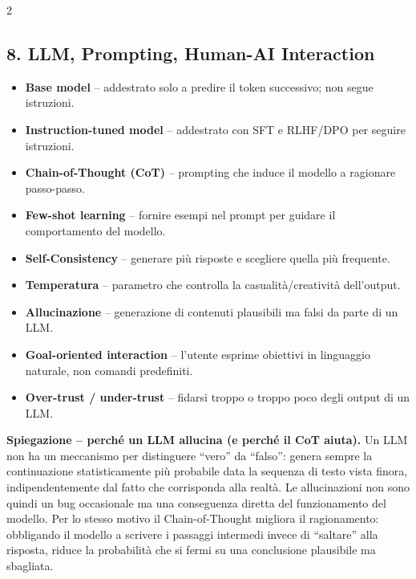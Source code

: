 \documentclass[10pt,a4paper]{extarticle}
\begin{document}
\begin{multicols}{2}
\subsection*{8. LLM, Prompting, Human-AI Interaction}
\begin{itemize}
\item \textbf{Base model} -- addestrato solo a predire il token successivo; non segue istruzioni.
\item \textbf{Instruction-tuned model} -- addestrato con SFT e RLHF/DPO per seguire istruzioni.
\item \textbf{Chain-of-Thought (CoT)} -- prompting che induce il modello a ragionare passo-passo.
\item \textbf{Few-shot learning} -- fornire esempi nel prompt per guidare il comportamento del modello.
\item \textbf{Self-Consistency} -- generare pi\`u risposte e scegliere quella pi\`u frequente.
\item \textbf{Temperatura} -- parametro che controlla la casualit\`a/creativit\`a dell'output.
\item \textbf{Allucinazione} -- generazione di contenuti plausibili ma falsi da parte di un LLM.
\item \textbf{Goal-oriented interaction} -- l'utente esprime obiettivi in linguaggio naturale, non comandi predefiniti.
\item \textbf{Over-trust / under-trust} -- fidarsi troppo o troppo poco degli output di un LLM.
\end{itemize}
\smallskip\noindent\textbf{\textcolor{blue!45!black}{Spiegazione -- perch\'e un LLM allucina (e perch\'e il CoT aiuta).}} Un LLM non ha un meccanismo per distinguere ``vero'' da ``falso'': genera sempre la continuazione statisticamente pi\`u probabile data la sequenza di testo vista finora, indipendentemente dal fatto che corrisponda alla realt\`a. Le allucinazioni non sono quindi un bug occasionale ma una conseguenza diretta del funzionamento del modello. Per lo stesso motivo il Chain-of-Thought migliora il ragionamento: obbligando il modello a scrivere i passaggi intermedi invece di ``saltare'' alla risposta, riduce la probabilit\`a che si fermi su una conclusione plausibile ma sbagliata.


\end{multicols}
\end{document}
